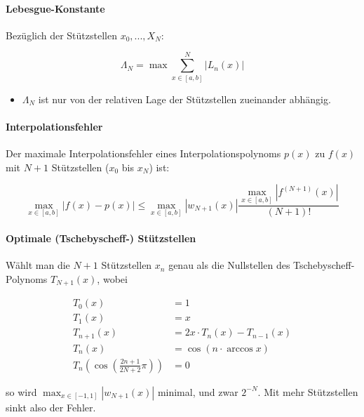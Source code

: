 \documentclass[a4paper, 14pt]{article}
\begin{document}
	\paragraph{Lebesgue-Konstante}

	Bezüglich der Stützstellen $x_0, ..., X_N$:

	\begin{equation}
		\Lambda_N = \max{\sum_{x \in [a, b]}^{N}{|L_n(x)|}}
	\end{equation}

	\begin{itemize}
		\item $\Lambda_N$ ist nur von der relativen Lage der Stützstellen zueinander abhängig.
	\end{itemize}

	\paragraph{Interpolationsfehler}

	Der maximale Interpolationsfehler eines Interpolationspolynoms $p(x)$ zu $f(x)$ mit $N + 1$ Stützstellen ($x_0$ bis $x_N$) ist:

	\begin{equation}
		\max_{x \in [a, b]}{|f(x) - p(x)|} \leq \max_{x \in [a, b]}{|w_{N + 1}(x)|}\frac{\max_{x \in [a, b]}{|f^{(N + 1)}(x)|}}{(N + 1)!}
	\end{equation}

	\paragraph{Optimale (Tschebyscheff-) Stützstellen}
	
	Wählt man die $N + 1$ Stützstellen $x_n$ genau als die Nullstellen des Tschebyscheff-Polynoms $T_{N + 1}(x)$, wobei

	\begin{align}
		T_0(x)       & = 1 \\
		T_1(x)       & = x \\
		T_{n + 1}(x) & = 2x \cdot T_n(x) - T_{n - 1}(x) \\
		T_n(x)       & = \cos(n \cdot \arccos{x}) \\
		T_n(\cos{\left( \frac{2n + 1}{2N + 2} \pi \right)})       & = 0
	\end{align}

	so wird $\max_{x \in [-1, 1]}{|w_{N + 1}(x)|}$ minimal, und zwar $2^{-N}$.
	Mit mehr Stützstellen sinkt also der Fehler.
\end{document}
